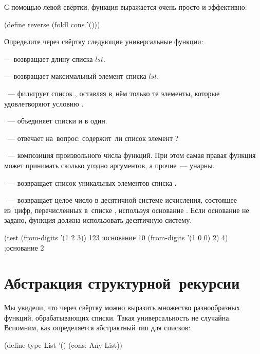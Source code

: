 С помощью левой свёртки, функция  выражается очень просто и эффективно:
\begin{SchemeCode}
(define reverse (foldl cons '()))
\end{SchemeCode}

\begin{Assignment}
Определите через свёртку следующие универсальные функции:

 --- возвращает длину списка $lst$.

 --- возвращает максимальный элемент списка $lst$.

~--- фильтрует список , оставляя в~нём только те элементы, которые удовлетворяют условию .
\medskip

 ~--- объединяет списки  и  в один.
\medskip

 ~--- отвечает на~вопрос: содержит~ли список  элемент ?
\medskip

 ~--- композиция произвольного числа функций. При этом самая правая функция может принимать сколько угодно аргументов, а прочие~--- унарны.
\medskip

\label{remove-duplicates} ~--- возвращает список уникальных элементов списка .
\medskip

~--- возвращает целое число в десятичной системе исчисления, состоящее из~цифр, перечисленных в~списке , используя основание . Если основание не задано, функция должна использовать десятичную систему.
\begin{Specification}
(test 
  (from-digits '(1 2 3))     123  ;основание 10
  (from-digits '(1 0 0) 2)   4)   ;основание 2
\end{Specification}
\end{Assignment}

\section{Абстракция структурной~рекурсии}%
Мы увидели, что через свёртку можно выразить множество разнообразных функций, обрабатывающих списки. Такая универсальность не случайна. Вспомним, как определяется абстрактный тип для списков:
\begin{SchemeCode}
(define-type List 
  '()
  (cons: Any List))
\end{SchemeCode}

